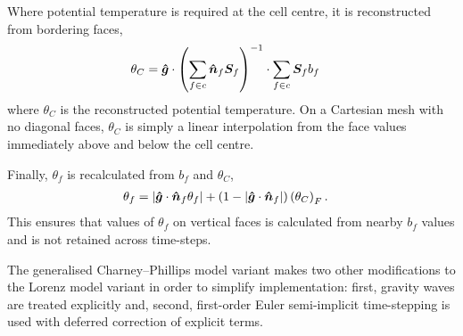 Where potential temperature is required at the cell centre, it is reconstructed from bordering faces,
\begin{align}
	\theta_C &= \bm{\hat{g}} \cdot \left( \sum_{f \in c} \bm{\hat{n}}_f \bm{S}_f \right)^{-1} \cdot \sum_{f \in c} \bm{S}_f b_f \label{eqn:cp:reconstruct}
\end{align}
where $\theta_C$ is the reconstructed potential temperature.  On a Cartesian mesh with no diagonal faces, $\theta_C$ is simply a linear interpolation from the face values immediately above and below the cell centre.

Finally, $\theta_f$ is recalculated from $b_f$ and $\theta_C$,
\begin{align}
	\theta_f &= \left\lvert  \bm{\hat{g}} \cdot \bm{\hat{n}}_f \theta_f \right\rvert + \left( 1 - \left\lvert \bm{\hat{g}} \cdot \bm{\hat{n}}_f  \right\rvert \right) \left( \theta_C \right)_F \text{.}
\end{align}
This ensures that values of $\theta_f$ on vertical faces is calculated from nearby $b_f$ values and is not retained across time-steps.

The generalised Charney--Phillips model variant makes two other modifications to the Lorenz model variant in order to simplify implementation: first, gravity waves are treated explicitly and, second, first-order Euler semi-implicit time-stepping is used with deferred correction of explicit terms.

